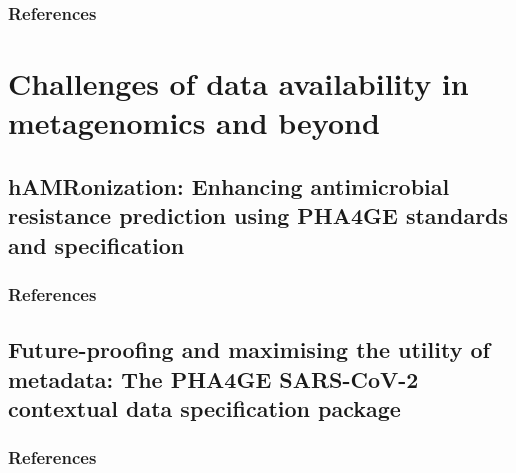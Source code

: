 \documentclass[12pt,a4paper,twoside,openright]{book}
\begin{document}
\begin{sloppy}
\thispagestyle{empty}
\clearpage \thispagestyle{empty}\mbox{}\clearpage
\newpage
\begin{refsection}

\newpage
\section{References}
\printbibliography[heading=none]
\end{refsection}

\part{Challenges of data availability in metagenomics and beyond}
\newpage
\thispagestyle{empty}
\chapter{hAMRonization: Enhancing antimicrobial resistance prediction using PHA4GE standards and specification\label{ch:paper5}}

\thispagestyle{empty}
\clearpage \thispagestyle{empty}\mbox{}\clearpage
\newpage
\begin{refsection}

\newpage
\section{References}
\printbibliography[heading=none]
\end{refsection}

\newpage
\thispagestyle{empty}
\chapter{Future-proofing and maximising the utility of metadata: The PHA4GE SARS-CoV-2 contextual data specification package\label{ch:paper6}}

\thispagestyle{empty}
\clearpage \thispagestyle{empty}\mbox{}\clearpage
\newpage
\begin{refsection}

\newpage
\section{References}
\printbibliography[heading=none]
\end{refsection}


\end{sloppy}
\end{document}
